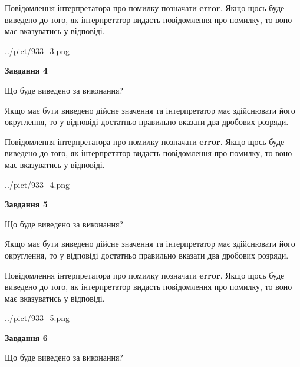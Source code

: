 \documentclass[12pt, ukrainian]{article}
\begin{document}
{\begin {Large}
Повідомлення інтерпретатора про помилку позначати \textbf{error}.
Якщо щось буде виведено до того, як інтерпретатор видасть повідомлення про помилку, 
то воно має вказуватись у відповіді. \par

\begin{center}
	{../pict/933_3.png}
\end{center}
\newpage

{\begin {center}\textbf{Завдання 4}\end {center}}\par
Що буде виведено за виконання? \par

Якщо має бути виведено дійсне значення та інтерпретатор має здійснювати його округлення, 
то у відповіді достатньо правильно вказати два дробових розряди.

Повідомлення інтерпретатора про помилку позначати \textbf{error}.
Якщо щось буде виведено до того, як інтерпретатор видасть повідомлення про помилку, 
то воно має вказуватись у відповіді. \par

\begin{center}
	{../pict/933_4.png}
\end{center}
\newpage

{\begin {center}\textbf{Завдання 5}\end {center}}\par
Що буде виведено за виконання? \par

Якщо має бути виведено дійсне значення та інтерпретатор має здійснювати його округлення, 
то у відповіді достатньо правильно вказати два дробових розряди.

Повідомлення інтерпретатора про помилку позначати \textbf{error}.
Якщо щось буде виведено до того, як інтерпретатор видасть повідомлення про помилку, 
то воно має вказуватись у відповіді. \par

\begin{center}
	{../pict/933_5.png}
\end{center}
\newpage

{\begin {center}\textbf{Завдання 6}\end {center}}\par
Що буде виведено за виконання? \par


\end{Large}}
\end{document}

